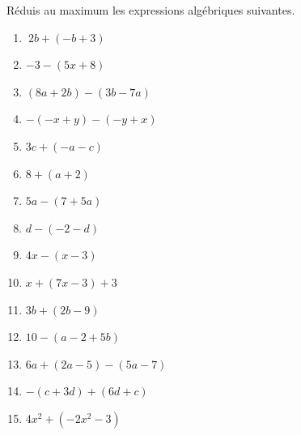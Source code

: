 \documentclass[../../syllabus_1.tex]{subfiles}
\begin{document}
\newpage
\begin{exercise}
    Réduis au maximum les expressions algébriques suivantes.
    \begin{enumerate}[cols=3, itemsep=.6cm]
        \item \(\ 2b + ( - b + 3)\)
        \item \(-3-(5x+8)\)
        \item \((8a+2b)-(3b-7a)\)
        \item \(- ( - x + y) - ( - y + x)\)
        \item \(3c + ( - a - c)\)
        \item \(8 + (a + 2)\)
        \item \(5a - (7 + 5a)\)
        \item \(d - ( - 2 - d)\)
        \item \(4x - (x - 3)\)
        \item \(x+ (7x-3)+3\)
        \item \(3b + (2b - 9)\)
        \item \(10 - (a - 2 + 5b)\)
        \item \(6a + (2a - 5) - (5a - 7)\)
        \item \(- (c + 3d) + (6d + c)\)
        \item \(4x^{2} + \left( - 2x^{2} - 3 \right)\)
    \end{enumerate}
\end{exercise}
\end{document}
